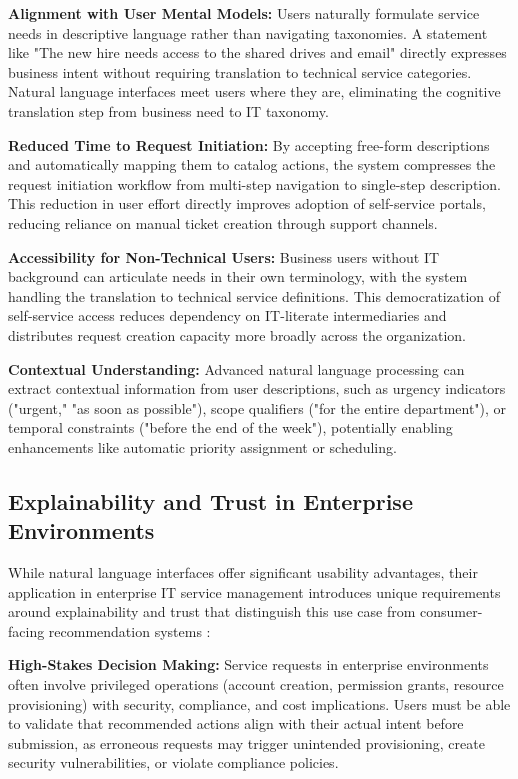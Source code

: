 \textbf{Alignment with User Mental Models:} Users naturally formulate service needs in descriptive language rather than navigating taxonomies. A statement like "The new hire needs access to the shared drives and email" directly expresses business intent without requiring translation to technical service categories. Natural language interfaces meet users where they are, eliminating the cognitive translation step from business need to IT taxonomy.

\textbf{Reduced Time to Request Initiation:} By accepting free-form descriptions and automatically mapping them to catalog actions, the system compresses the request initiation workflow from multi-step navigation to single-step description. This reduction in user effort directly improves adoption of self-service portals, reducing reliance on manual ticket creation through support channels.

\textbf{Accessibility for Non-Technical Users:} Business users without IT background can articulate needs in their own terminology, with the system handling the translation to technical service definitions. This democratization of self-service access reduces dependency on IT-literate intermediaries and distributes request creation capacity more broadly across the organization.

\textbf{Contextual Understanding:} Advanced natural language processing can extract contextual information from user descriptions, such as urgency indicators ("urgent," "as soon as possible"), scope qualifiers ("for the entire department"), or temporal constraints ("before the end of the week"), potentially enabling enhancements like automatic priority assignment or scheduling.

\subsection{Explainability and Trust in Enterprise Environments}
    
While natural language interfaces offer significant usability advantages, their application in enterprise IT service management introduces unique requirements around explainability and trust that distinguish this use case from consumer-facing recommendation systems \cite{madabhushini2025explainable}:

\textbf{High-Stakes Decision Making:} Service requests in enterprise environments often involve privileged operations (account creation, permission grants, resource provisioning) with security, compliance, and cost implications. Users must be able to validate that recommended actions align with their actual intent before submission, as erroneous requests may trigger unintended provisioning, create security vulnerabilities, or violate compliance policies.

